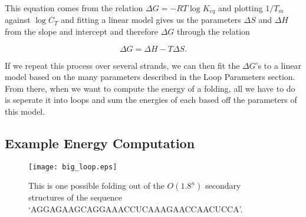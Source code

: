 This equation comes from the relation $\Delta G = -RT \log{K_{eq}}$
and plotting $1/T_m$ against $\log{C_T}$ and fitting a linear model
gives us the parameters $\Delta S$ and $\Delta H$ from the slope and
intercept and therefore $\Delta G$ through the relation

\begin{equation}
\Delta G = \Delta H - T \Delta S.
\end{equation}

If we repeat this process over several strands, we can then fit the
$\Delta G$'s to a linear model based on the many parameters described
in the Loop Parameters section. From there, when we want to compute
the energy of a folding, all we have to do is seperate it into loops
and sum the energies of each based off the parameters of this model.


%
%

\subsection{Example Energy Computation}

\begin{figure}[t]
  \texttt{[image: big\_loop.eps]}

  \captionsetup{singlelinecheck=off}
  \caption[.]{
    This is one possible folding out of the $O(1.8^n)$ secondary
    structures of the sequence
    `AGGAGAAGCAGGAAACCUCAAAGAACCAACUCCA'.    
  }
  \label{fig:bigLoop}
\end{figure}

